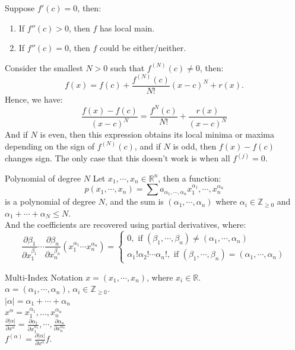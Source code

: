 \documentclass[11pt]{article}
\newenvironment{definition}[1]{\begin{defbox}{#1}{}}{\end{defbox}}
\newenvironment{example}[1]{\begin{exbox}{#1}{}}{\end{exbox}}
\theoremstyle{quiet}
\theoremstyle{quietremark}
\begin{document}
\begin{example}
Suppose $f'(c)=0$, then:
\begin{enumerate}
\item If $f''(c)>0$, then $f$ has local main.
\item If $f''(c)=0$, then $f$ could be either/neither.
\end{enumerate}
Consider the smallest $N>0$ such that $f^{(N)}(c)\ne 0$, then:
\[
f(x)=f(c)+\frac{f^{(N)}(c)}{N!}(x-c)^N+r(x).
\]
Hence, we have:
\[
\frac{f(x)-f(c)}{(x-c)^N}=\frac{f^N(c)}{N!}+\frac{r(x)}{(x-c)^N}
\]
And if $N$ is even, then this expression obtains its local minima or maxima depending on the sign of $f^{(N)}(c)$, and if $N$ is odd, then $f(x)-f(c)$ changes sign. The only case that this doesn't work is when all $f^{(j)}=0$.
\end{example}

\begin{definition}{Polynomial of degree $N$}
Let $x_1,\cdots,x_n\in\mathbb{R}^n$, then a function:
\[
p(x_1,\cdots,x_n)=\sum a_{\alpha_1,\cdots,\alpha_n}x_1^{\alpha_1},\cdots,x_n^{\alpha_n}
\]
is a polynomial of degree $N$, and the sum is $(\alpha_1,\cdots,\alpha_n)$ where $\alpha_i\in\mathbb{Z}_{\ge 0}$ and $\alpha_1+\cdots+\alpha_N\le N$.\\
And the coefficients are recovered using partial derivatives, where:
\[
\frac{\partial\beta_1}{\partial x_1^{\beta_1}}\cdots\frac{\partial \beta_n}{\partial x_n^{\beta_n}}(x_1^{\alpha_1}\cdots x_n^{\alpha_n})=\begin{cases}0, \text{ if }(\beta_1,\cdots,\beta_n)\ne(\alpha_1,\cdots,\alpha_n)\\\alpha_1!\alpha_2!\cdots\alpha_n!,\text{ if }(\beta_1,\cdots,\beta_n)=(\alpha_1,\cdots,\alpha_n)\end{cases}
\]
\end{definition}

\begin{definition}{Multi-Index Notation}
$x=(x_1,\cdots,x_n)$, where $x_i\in\mathbb{R}$.\\
$\alpha=(\alpha_1,\cdots,\alpha_n)$, $\alpha_i\in\mathbb{Z_{\ge 0}}$.\\
$|\alpha|=\alpha_1+\cdots+\alpha_n$\\
$x^\alpha=x_1^{\alpha_1},...,x_n^{\alpha_n}$\\
$\frac{\partial|\alpha|}{\partial x^\alpha}=\frac{\partial\alpha_1}{\partial x_1^{\alpha_1}},\cdots,\frac{\partial\alpha_n}{\partial x_n^{\alpha_n}}$\\
$f^{(\alpha)}=\frac{\partial |\alpha|}{\partial x^\alpha}f$.
\end{definition}
\end{document}
